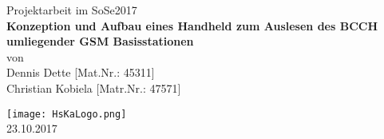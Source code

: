 %
%
\begin{titlepage}
\begin{center}
         {\large  Projektarbeit im SoSe2017\\}
  \vspace{10mm}
         {\Large
	\textbf{Konzeption und Aufbau eines Handheld zum Auslesen des BCCH umliegender GSM Basisstationen }\\}
  \vspace{10mm}
         {\large von}\\
         {\large Dennis Dette [Mat.Nr.: 45311] 
          \\ Christian Kobiela [Matr.Nr.: 47571]}\\
  \vfill
  
  \vspace{5mm}
                  \texttt{[image: HsKaLogo.png]}\\
  \vspace{5mm}
  \vspace{10mm}
         {\large 23.10.2017}
\end{center}
\end{titlepage}

\clearpage
\thispagestyle{empty}
\cleardoublepage
